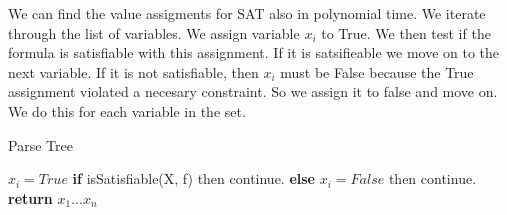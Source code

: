 \documentclass[11pt]{article}
\begin{document}
We can find the value assigments for SAT also in polynomial time. We iterate through the list of variables. We assign variable $x_i$ to True. We then test if the formula is satisfiable with this assignment. If it is satsifieable we move on to the next variable. If it is not satisfiable, then $x_i$ must be False because the True assignment violated a necesary constraint. So we assign it to false and move on. We do this for each variable in the set. 

\begin{algorithm}
    \caption{Parse Tree}\label{guests}
    \begin{algorithmic}[1]
			\State $x_i = True$
			\State \textbf{if} isSatisfiable(X, f) then continue.
			\State \textbf{else} $x_i = False$ then continue.
		\EndFor
       \State \textbf{return} $x_1 ... x_n$
    \EndFunction
    \end{algorithmic}
\end{algorithm}
\end{document}
